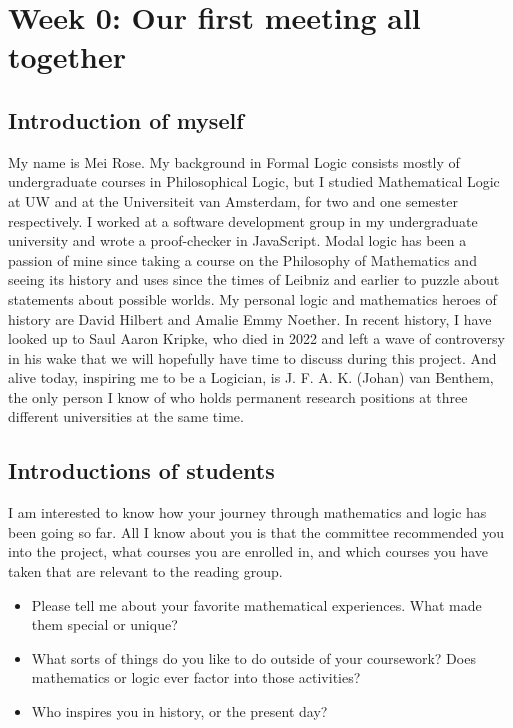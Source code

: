 \chapter[Our first meeting all together]{Week 0: Our first meeting all together}

\setcounter{section}{-1}
\section{Introduction of myself}
My name is Mei Rose. 
My background in Formal Logic consists mostly of undergraduate courses in Philosophical Logic, but I studied Mathematical Logic at UW and 
at the Universiteit van Amsterdam, for two and one semester respectively. I worked at a software development group in my undergraduate university 
and wrote a proof-checker in JavaScript. Modal logic has been a passion of mine since taking a course on the Philosophy of Mathematics
and seeing its history and uses since the times of Leibniz and earlier to puzzle about statements about possible worlds. My personal 
logic and mathematics heroes of history are David Hilbert and Amalie Emmy Noether. In recent history, I have looked up to Saul Aaron Kripke, 
who died in 2022 and left a wave of controversy in his wake that we will hopefully have time to discuss during this project. And alive today, 
inspiring me to be a Logician, is J. F. A. K. (Johan) van Benthem, the only person I know of who holds permanent research positions 
at three different universities at the same time.

\section{Introductions of students}
I am interested to know how your journey through mathematics and logic has been going so far. 
All I know about you is that the committee recommended you into the project, what courses you are enrolled in, 
and which courses you have taken that are relevant to the reading group. 
\begin{itemize}
    \item Please tell me about your favorite mathematical experiences. What made them special or unique?
    \item What sorts of things do you like to do outside of your coursework? Does mathematics or logic ever factor into those activities? 
    \item Who inspires you in history, or the present day?
\end{itemize}

